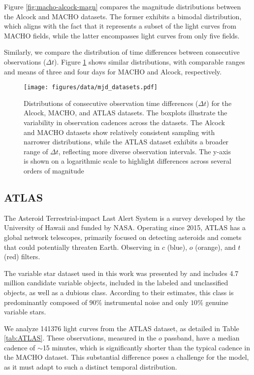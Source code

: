 Figure \ref{fig:macho-alcock-magn} compares the magnitude distributions between the Alcock and MACHO datasets. The former exhibits a bimodal distribution, which aligns with the fact that it represents a subset of the light curves from MACHO fields, while the latter encompasses light curves from only five fields. 

Similarly, we compare the distribution of time differences between consecutive observations ($\Delta t$). Figure \ref{fig:macho-alcock-mjd} shows similar distributions, with comparable ranges and means of three and four days for MACHO and Alcock, respectively.
\begin{figure}
    \texttt{[image: figures/data/mjd\_datasets.pdf]}
    \caption{Distributions of consecutive observation time differences ($\Delta t$) for the Alcock, MACHO, and ATLAS datasets. The boxplots illustrate the variability in observation cadences across the datasets. The Alcock and MACHO datasets show relatively consistent sampling with narrower distributions, while the ATLAS dataset exhibits a broader range of $\Delta t$, reflecting more diverse observation intervals. The y-axis is shown on a logarithmic scale to highlight differences across several orders of magnitude }
    \label{fig:macho-alcock-mjd}
\end{figure}

\subsection{ATLAS}
The Asteroid Terrestrial-impact Last Alert System \citep[ATLAS; ][]{Tonry2018} is a survey developed by the University of Hawaii and funded by NASA. Operating since 2015, ATLAS has a global network telescopes, primarily focused on detecting asteroids and comets that could potentially threaten Earth. Observing in $c$ (blue), $o$ (orange), and $t$ (red) filters.

The variable star dataset used in this work was presented by \citet{heinze2018first} and includes 4.7 million candidate variable objects, included in the labeled and unclassified objects, as well as a dubious class. According to their estimates, this class is predominantly composed of $90\%$ instrumental noise and only $10\%$ genuine variable stars.

We analyze \num{141376} light curves from the ATLAS dataset, as detailed in Table \ref{tab:ATLAS}. These observations, measured in the $o$ passband, have a median cadence of $\sim$15 minutes, which is significantly shorter than the typical cadence in the MACHO dataset. This substantial difference poses a challenge for the model, as it must adapt to such a distinct temporal distribution. 

